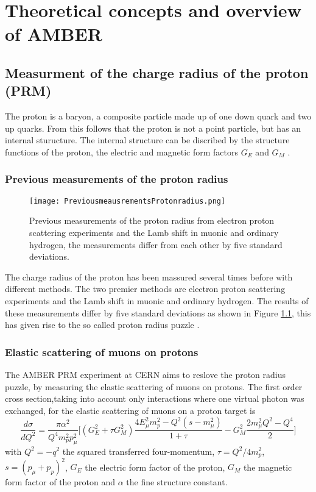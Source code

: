 \chapter{Theoretical concepts and overview of AMBER}\label{cha:theory}


\section{Measurment of the charge radius of the proton (PRM)}\label{sec:proton_radius}
The proton is a baryon, a composite particle made up of one down quark and  two up quarks.
From this follows that the proton is not a point particle, but has an internal sturucture.
\newline
The internal structure can be discribed by the structure functions of the proton, 
the electric and magnetic form factors $G_E$ and $G_M$ \autocite{ProposalAmber}.	
\subsection{Previous measurements of the proton radius}
\begin{figure}[h]
	\centering
	\texttt{[image: PreviousmeausrementsProtonradius.png]}
	\caption{Previous measurements of the proton radius from electron proton  scattering experiments and the Lamb shift in muonic and ordinary hydrogen,
	 the measurements differ from each other by five standard deviations. \autocite{ProposalAmber} }
	\label{fig:previous_proton_radius}
\end{figure}

The charge radius of the proton has been massured several times before with different methods.
The two premier methods are electron proton scattering experiments and the Lamb shift in muonic and ordinary hydrogen.
The results of these measurements differ by five standard deviations as shown in Figure \ref{fig:previous_proton_radius},
this has given rise to the so called proton radius puzzle \autocite{ProposalAmber}.

\subsection{Elastic scattering of muons on protons}
The AMBER PRM experiment at CERN aims to reslove the proton radius puzzle, by measuring the elastic scattering of muons on protons.
The first order cross section,taking into account only interactions where one virtual photon was exchanged, 
for the elastic scattering of muons on a proton target is \autocite{intentAmber}
\begin{equation}
\label{eq:cross_section}
\frac{d\sigma}{dQ^2} = \frac{\pi \alpha^2}{Q^4 m_p^2 p_\mu^2} \bigg[ \left( G_E^2 + \tau G_M^2 \right) \frac{ 4E_\mu^2 m_p^2 
- Q^2 (s - m_\mu^2)}{1 + \tau }  - G_M^2 \frac{ 2m_\mu^2 Q^2 - Q^4}{2} \bigg]
\end{equation}
with  $Q^2 = -q^2$ 	the squared transferred four-momentum, $\tau = Q^2 / 4m_p^2$, $s = (p_\mu + p_p)^2$, 
 $G_E$ the electric form factor of the proton,
  $G_M$ the magnetic form factor of the proton and $\alpha$ the fine structure constant.
  
